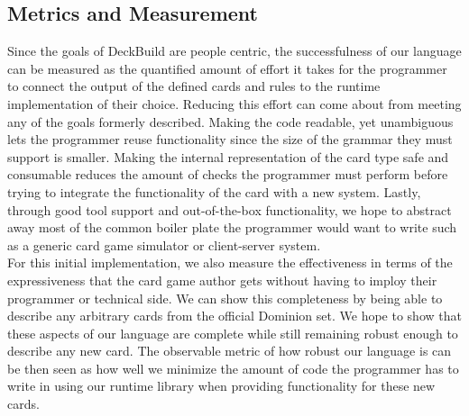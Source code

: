 \subsection{Metrics and Measurement}
Since the goals of DeckBuild are people centric, the successfulness of our language can be measured as the quantified
amount of effort it takes for the programmer to connect the output of the defined cards and rules to the runtime implementation of their
choice. Reducing this effort can come about from meeting any of the goals formerly described. Making the code readable, yet unambiguous
lets the programmer reuse functionality since the size of the grammar they must support is smaller. Making the internal representation of
the card type safe and consumable reduces the amount of checks the programmer must perform before trying to integrate the functionality of
the card with a new system. Lastly, through good tool support and out-of-the-box functionality, we hope to abstract away most of the common
boiler plate the programmer would want to write such as a generic card game simulator or client-server system.
\\
For this initial implementation, we also measure the effectiveness in terms of the expressiveness that the card game author gets
without having to imploy their programmer or technical side. We can show this completeness by being able to describe any arbitrary cards from the
official Dominion set. We hope to show that these aspects of our language are complete while still remaining robust enough to describe any
new card. The observable metric of how robust our language is can be then seen as how well we minimize the amount of code the programmer has to
write in using our runtime library when providing functionality for these new cards.
